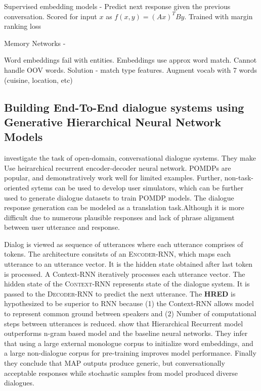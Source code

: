 \documentclass[11pt,a4paper]{article}
\begin{document}
Supervised embedding models - Predict next response given the previous conversation. Scored for input $x$ as $f(x, y) = (Ax)^TBy$. Trained with margin ranking loss

Memory Networks -

Word embeddings fail with entities. Embeddings use approx word match. Cannot handle OOV words.
Solution - match type features. Augment vocab with 7 words (cuisine, location, etc)

\subsection{Building End-To-End dialogue systems using Generative Hierarchical Neural Network Models}

\cite{Serban2015BuildingED} investigate the task of open-domain, conversational dialogue systems. They make Use heirarchical recurrent encoder-decoder neural network. POMDPs are popular, and demonstratively work well for limited examples. Further, non-task-oriented sytems can be used to develop user simulators, which can be further used to generate dialogue datasets to train POMDP models. The dialogue response generation can be modeled as a translation task.Although it is more difficult due to numerous plausible responses and lack of phrase alignment between user utterance and response.

Dialog is viewed as sequence of utterances where each utterance comprises of tokens. The architecture consitsts of an \textsc{Encoder-RNN}, which maps each utterance to an utterance vector. It is the hidden state obtained after last token is processed. A Context-RNN iteratively processes each utterance vector. The hidden state of the \textsc{Context-RNN} represents state of the dialogue system. It is passed to the \textsc{Decoder-RNN} to predict the next utterance. The \textbf{HRED} is hypothesized to be superior to RNN because (1) the Context-RNN allows model to represent common ground between speakers and (2) Number of computational steps between utterances is reduced. \cite{Serban2015BuildingED} show that Hierarchical Recurrent model outperforms n-gram based model and the baseline neural networks. They infer that using a large external monologue corpus to initialize word embeddings, and a large non-dialogue corpus for pre-training improves model performance. Finally they conclude that MAP outputs produce generic, but conversationally acceptable responses while stochastic samples from model produced diverse dialogues.
\end{document}
